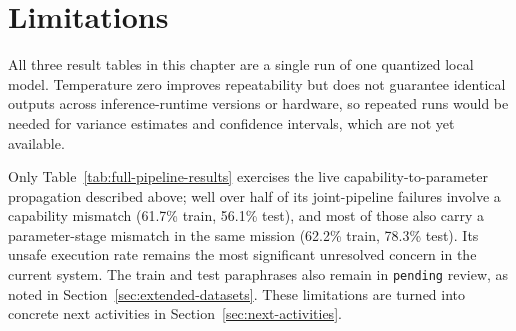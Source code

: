 \section{Limitations}
\label{sec:dataset-results-limitations}

All three result tables in this chapter are a single run of one quantized local model. Temperature zero improves repeatability but does not guarantee identical outputs across inference-runtime versions or hardware, so repeated runs would be needed for variance estimates and confidence intervals, which are not yet available.

Only Table~\ref{tab:full-pipeline-results} exercises the live capability-to-parameter propagation described above; well over half of its joint-pipeline failures involve a capability mismatch (61.7\% train, 56.1\% test), and most of those also carry a parameter-stage mismatch in the same mission (62.2\% train, 78.3\% test). Its unsafe execution rate remains the most significant unresolved concern in the current system. The train and test paraphrases also remain in \texttt{pending} review, as noted in Section~\ref{sec:extended-datasets}. These limitations are turned into concrete next activities in Section~\ref{sec:next-activities}.

